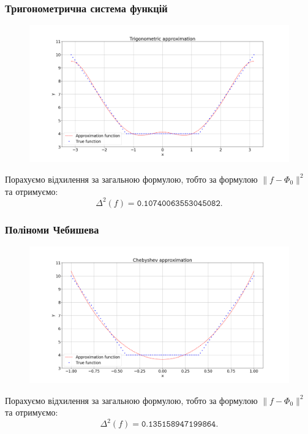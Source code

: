 \subsubsection{Тригонометрична система функцій}
\vspace{-1.5em}
\begin{figure}[H]
    \centering
    \includegraphics[width=\textwidth]{3.png}
\end{figure}
\vspace{-1.5em}
Порахуємо відхилення за загальною формулою, тобто за формулою $\|f - \Phi_0\|^2$ та отримуємо: \[ \Delta^2(f) = \texttt{0.10740063553045082}. \]

\subsubsection{Поліноми Чебишева}
\vspace{-1.5em}
\begin{figure}[H]
    \centering
    \includegraphics[width=\textwidth]{4.png}
\end{figure}
\vspace{-1.5em}
Порахуємо відхилення за загальною формулою, тобто за формулою $\|f - \Phi_0\|^2$ та отримуємо: \[ \Delta^2(f) = \texttt{0.135158947199864}. \]

